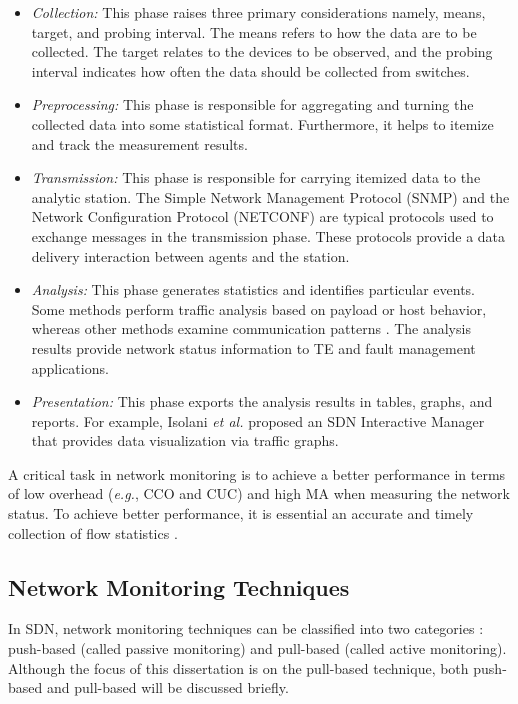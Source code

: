 \begin{itemize}
    \item \textit{Collection:} This phase raises three primary considerations namely, means, target, and probing interval. The means refers to how the data are to be collected. The target relates to the devices to be observed, and the probing interval indicates how often the data should be collected from switches.
    \item \textit{Preprocessing:} This phase is responsible for aggregating and turning the collected data into some statistical format. Furthermore, it helps to itemize and track the measurement results.
    \item \textit{Transmission:} This phase is responsible for carrying itemized data to the analytic station. The Simple Network Management Protocol (SNMP) and the Network Configuration Protocol (NETCONF) are typical protocols used to exchange messages in the transmission phase. These protocols provide a data delivery interaction between agents and the station.
    \item \textit{Analysis:} This phase generates statistics and identifies particular events. Some methods perform traffic analysis based on payload or host behavior, whereas other methods examine communication patterns \cite{Bujlow_2012:traffic_classificatiom_c5, dong_2012:traffic_clasification_ml}. The analysis results provide network status information to TE and fault management applications. 
    \item \textit{Presentation:} This phase exports the analysis results in tables, graphs, and reports. For example, Isolani \textit{et al.} \cite{isolani_2015:interactive} proposed an SDN Interactive Manager that provides data visualization via traffic graphs.
\end{itemize}{}

A critical task in network monitoring is to achieve a better performance in terms of low overhead (\textit{e.g.}, CCO and CUC) and high MA when measuring the network status. To achieve better performance, it is essential an accurate and timely collection of flow statistics \cite{rendon2014:monitoring}.

\subsection{Network Monitoring Techniques}
\label{subsec:monitoring-approaches}

In SDN, network monitoring techniques can be classified into two categories \cite{mohan2011:active_passive,Ningning_2003:probing_techniques}: push-based (called passive monitoring) and pull-based (called active monitoring). Although the focus of this dissertation is on the pull-based technique, both push-based and pull-based will be discussed briefly.

